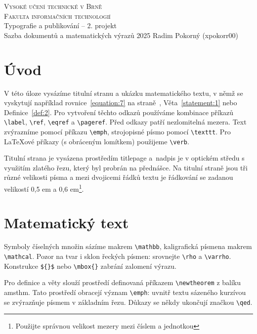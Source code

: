 \documentclass[a4paper,11pt,twocolumn]{article}
\begin{document}
\begin{titlepage}
    \begin{center}
        {\Huge\textsc{Vysoké učení technické v Brně}\\}
        \vspace{0.5em}
        {\huge \textsc{Fakulta informačních technologií}\\}
        \vfill
        \vspace{-5cm}
        {\huge Typografie a publikování – 2. projekt\\}
        \vspace{0.6em}
        {\huge Sazba dokumentů a matematických výrazů}
        \vfill
        \Large{2025} \hfill \Large{Radim Pokorný (xpokorr00)}
    \end{center}
\end{titlepage}

\section*{Úvod}

V této úloze vysázíme titulní stranu a ukázku matematického textu,
v němž se vyskytují například
rovnice~\eqref{equation:7} na straně~\pageref{page:1}, Věta~\ref{statement:1} nebo Definice~\ref{def:2}.
Pro vytvoření těchto odkazů používáme kombinace příkazů
\verb|\label|, \verb|\ref|, \verb|\eqref| a \verb|\pageref|.
Před odkazy patří nezlomitelná mezera.
Text zvýrazníme pomocí příkazu \verb|\emph|, strojopisné písmo pomocí \verb|\texttt|.
Pro \LaTeX{}ové příkazy (s obráceným lomítkem) použijeme \verb|\verb|.

Titulní strana je vysázena prostředím titlepage a~nadpis je v optickém středu
s využitím zlatého řezu, který byl probrán na přednášce.
Na titulní straně jsou tři různé velikosti písma a mezi dvojicemi řádků textu
je řádkování se zadanou  velikostí 0,5 em a 0,6 em\footnote{Použijte správnou velikost mezery mezi číslem a jednotkou}.


\section{Matematický text}

Symboly číselných množin sázíme makrem \verb|\mathbb|,
kaligrafická písmena  makrem \verb|\mathcal|.
Pozor na tvar i sklon řeckých písmen: srovnejte \verb|\rho| a \verb|\varrho|.
Konstrukce \verb|${}$| nebo \verb|\mbox{}| zabrání zalomení výrazu.

Pro definice a věty slouží prostředí definovaná příkazem \verb|\newtheorem| z balíku amsthm.
Tato prostředí obracejí význam \verb|\emph|:
uvnitř textu sázeného kurzívou se zvýrazňuje písmem v základním řezu.
Důkazy se někdy ukončují značkou \verb|\qed|.
\end{document}
